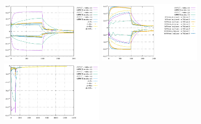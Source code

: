 \includegraphics[width=5cm]{python_codes/fieldstone_64/results/icesheetload/tauxx}
\includegraphics[width=5cm]{python_codes/fieldstone_64/results/icesheetload/tauyy}
\includegraphics[width=5cm]{python_codes/fieldstone_64/results/icesheetload/tauxy}
